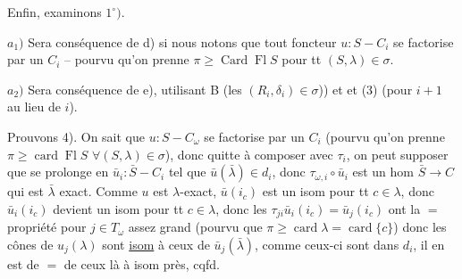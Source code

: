 Enfin,  examinons $1^\circ)$. 

$a_1)$ Sera conséquence de d) si nous notons que tout foncteur $u:S-C_i$ se factorise par un $C_i$ -- pourvu qu'on prenne $\pi\geq\operatorname{Card}\operatorname{Fl}S$ pour tt $(S,\lambda)\in\sigma$.

$a_2)$ Sera conséquence de e), utilisant B (les $(R_i,\delta_i)\in\sigma$)) et  et (3) (pour $i+1$ au lieu de $i$).



Prouvons 4). On sait que $u:S-C_\omega$ se factorise par un  $C_i$ (pourvu qu'on prenne $\pi\geq\operatorname{card}\operatorname{Fl}S$ $\forall(S,\lambda)\in\sigma$), donc quitte à composer avec $\tau_i$, on peut supposer que  se prolonge en $\bar u_i:\bar S-C_i$ tel que $\bar u(\bar\lambda)\in d_i$, donc $\tau_{\omega,i}\circ\bar u_i$ est un hom $\bar S\to C$ qui est $\bar\lambda$ exact.   Comme
$u$ est $\lambda$-exact, $\bar u(i_c)$ est un isom pour tt $c\in\lambda$, donc $\bar u_i(i_c)$ devient un isom pour tt $c\in\lambda$, donc les $\tau_{ji}\bar u_i(i_c)=\bar u_j(i_c)$ ont la $=$ propriété pour $j\in T_\omega$ assez grand (pourvu que $\pi\geq\operatorname{card}\lambda=\operatorname{card}\{c\}$) donc  les  cônes de $u_j(\lambda)$ sont \uline{isom} à ceux de $\bar u_j(\bar\lambda)$, comme ceux-ci sont dans $d_i$, il en est de $=$ de ceux là à isom près, cqfd.


\margin{$\cdot\!\cdot\quad\cdot\ \cdot$}


